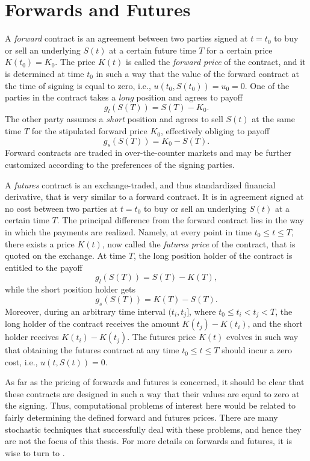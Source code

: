 \documentclass{UUThesisTemplate}
\begin{document}
\section{Forwards and Futures}
\label{sec:futures}
\par A \emph{forward} contract is an agreement between two parties signed at $t=t_0$ to buy or sell an underlying $S(t)$ at a certain future time $T$ for a certain price $K(t_0)=K_0$. The price $K(t)$ is called the \emph{forward price} of the contract, and it is determined at time $t_0$ in such a way that the value of the forward contract at the time of signing is equal to zero, i.e., $u(t_0,S(t_0))=u_0=0$. One of the parties in the contract takes a \emph{long} position and agrees to payoff $$g_l(S(T))=S(T)-K_0.$$ The other party assumes a \emph{short} position and agrees to sell $S(t)$ at the same time $T$ for the stipulated forward price $K_0$, effectively obliging to payoff $$g_s(S(T))=K_0-S(T).$$ Forward contracts are traded in over-the-counter markets and may be further customized according to the preferences of the signing parties.
\par A \emph{futures} contract is an exchange-traded, and thus standardized financial derivative, that is very similar to a forward contract. It is in agreement signed at no cost between two parties at $t=t_0$ to buy or sell an underlying $S(t)$ at a certain time $T$. The principal difference from the forward contract lies in the way in which the payments are realized. Namely, at every point in time $t_0 \leq t \leq T$, there exists a price $K(t)$, now called the \emph{futures price} of the contract, that is quoted on the exchange. At time $T$, the long position holder of the contract is entitled to the payoff $$g_l(S(T))=S(T)-K(T),$$ while the short position holder gets $$g_s(S(T))=K(T)-S(T).$$ Moreover, during an arbitrary time interval $(t_i,t_j]$, where $t_0 \leq t_i < t_j < T$, the long holder of the contract receives the amount $K(t_j)-K(t_i)$, and the short holder receives $K(t_i)-K(t_j)$. The futures price $K(t)$ evolves in such way that obtaining the futures contract at any time $t_0 \leq t \leq T$ should incur a zero cost, i.e., $u(t,S(t))=0$. 
\par As far as the pricing of forwards and futures is concerned, it should be clear that these contracts are designed in such a way that their values are equal to zero at the signing. Thus, computational problems of interest here would be related to fairly determining the defined forward and futures prices. There are many stochastic techniques that successfully deal with these problems, and hence they are not the focus of this thesis. For more details on forwards and futures, it is wise to turn to \cite{hull2017options,duffie1989futures}.  
%
\end{document}
